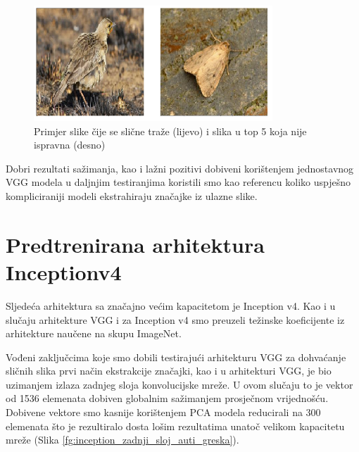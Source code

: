 \documentclass[times, utf8, proizvoljni, numeric]{fer}
\begin{document}
\begin{figure}[H]
\begin{center}
	\captionsetup{justification=centering}
	\includegraphics[width=0.8\textwidth]{./imgs/greske_vgg.png}
	\caption{Primjer slike čije se slične traže (lijevo) i slika u top 5 koja nije ispravna (desno)}
	\label{fg:greske_vgg}
\end{center}
\end{figure}

Dobri rezultati sažimanja, kao i lažni pozitivi dobiveni korištenjem jednostavnog VGG modela u daljnjim testiranjima koristili smo kao referencu koliko uspješno kompliciraniji modeli ekstrahiraju značajke iz ulazne slike.

\section{Predtrenirana arhitektura Inceptionv4}

Sljedeća arhitektura sa značajno većim kapacitetom je Inception v4. Kao i u slučaju arhitekture VGG i za Inception v4 smo preuzeli težinske koeficijente iz arhitekture naučene na skupu ImageNet.

Vođeni zaključcima koje smo dobili testirajući arhitekturu VGG za dohvaćanje sličnih slika prvi način ekstrakcije značajki, kao i u arhitekturi VGG, je bio uzimanjem izlaza zadnjeg sloja konvolucijske mreže. U ovom slučaju to je vektor od 1536 elemenata dobiven globalnim sažimanjem prosječnom vrijednošću. Dobivene vektore smo kasnije korištenjem PCA modela reducirali na 300 elemenata što je rezultiralo dosta lošim rezultatima unatoč velikom kapacitetu mreže (Slika \ref{fg:inception_zadnji_sloj_auti_greska}).
\end{document}
